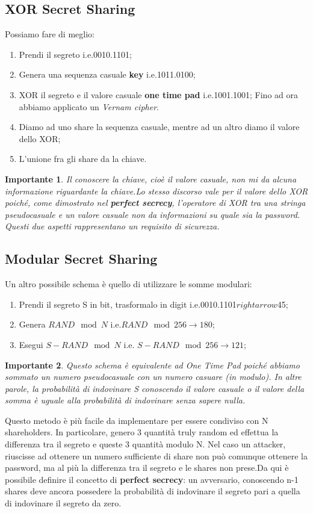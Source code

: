 \documentclass{book}
\newtheorem*{Importante}{\textbf{Importante}}
\theoremstyle{definition}
\begin{document}
\subsection{XOR Secret Sharing}
Possiamo fare di meglio:\begin{enumerate}
    \item Prendi il segreto i.e.0010.1101;
    \item Genera una sequenza casuale \textbf{key} i.e.1011.0100;
    \item XOR il segreto e il valore casuale \textbf{one time pad} i.e.1001.1001;\newline
          Fino ad ora abbiamo applicato un \emph{Vernam cipher}\@.
    \item Diamo ad uno share la sequenza casuale, mentre ad un altro diamo il valore dello XOR;\@
    \item L'unione fra gli share da la chiave\@.
\end{enumerate}
\begin{Importante}
    Il conoscere la chiave, cioè il valore casuale, non mi da alcuna informazione riguardante la chiave\@.\newline Lo stesso discorso vale per il valore dello XOR poiché, come dimostrato nel \textbf{perfect secrecy}, l'operatore di XOR tra una stringa pseudocasuale e un valore casuale non da informazioni su quale sia la password\@.\newline
    Questi due aspetti rappresentano un requisito di sicurezza\@.
\end{Importante}
\newpage
\subsection{Modular Secret Sharing}
Un altro possibile schema è quello di utilizzare le somme modulari:\begin{enumerate}
    \item Prendi il segreto S in bit, trasformalo in digit i.e.0010.1101\(rightarrow\)45;
    \item Genera \(RAND\mod{N}\) i.e.\(RAND\mod{256} \rightarrow  180\);
    \item Esegui \(S-RAND\mod{N}\) i.e. \(S-RAND\mod{256}\rightarrow  121\);
\end{enumerate}
\begin{Importante}
    Questo schema è equivalente ad One Time Pad poiché abbiamo sommato un numero pseudocasuale con un numero casuare (in modulo)\@. In altre parole, la probabilità di indovinare S conoscendo il valore casuale o il valore della somma è uguale alla probabilità di indovinare senza sapere nulla\@.
\end{Importante}
Questo metodo è più facile da implementare per essere condiviso con N shareholders\@. In particolare, genero 3 quantità truly random ed effettua la differenza tra il segreto e queste 3 quantità modulo N\@.
Nel caso un attacker, riuscisse ad ottenere un numero sufficiente di share non può comunque ottenere la password, ma al più la differenza tra il segreto e le shares non prese\@.\newline Da qui è possibile definire il concetto di \textbf{perfect secrecy}: un avversario, conoscendo n-1 shares deve ancora possedere la probabilità di indovinare il segreto pari a quella di indovinare il segreto da zero\@.
\end{document}
